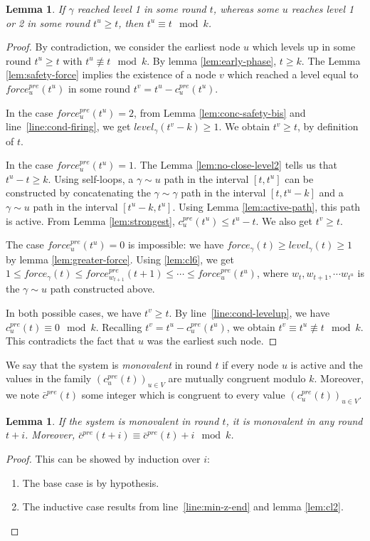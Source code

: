 \documentclass[11pt,letterpaper]{article}
\newtheorem{lem}[thm]{Lemma}
\newcommand{\cent}{\gamma}
\begin{document}
\begin{lem} \label{lem:later-level1}
	If $\cent$ reached level 1 in some round $t$, whereas some $u$ reaches level 1 or 2 in some round $t^u \geq t$, then $t^u \equiv t \mod k$. 
\end{lem}
\begin{proof}
	By contradiction, we consider the earliest node $u$ which levels up in some round $t^u \geq t$ with $t^u \not\equiv t \mod k$.
	By lemma \ref{lem:early-phase}, $t \geq k$.
	The Lemma \ref{lem:safety-force} implies the existence of a node $v$ which reached a level equal to $force_u^{pre}(t^u)$ in some round $t^v = t^u-c_u^{pre}(t^u)$. 

	In the case $force_u^{pre}(t^u) = 2$, from Lemma \ref{lem:conc-safety-bis} and line~\ref{line:cond-firing}, we get $level_\cent(t^v-k) \geq 1$. We obtain $t^v \geq t$, by definition of $t$.

	In the case $force_u^{pre}(t^u) = 1$.
	The Lemma \ref{lem:no-close-level2} tells us that $t^u-t \geq k$.
	Using self-loops, a $\cent \sim u$ path in the interval $[t,t^u]$ can be constructed by concatenating the $\cent \sim \cent$ path in the interval $[t,t^u-k]$
	and a $\cent \sim u$ path in the interval $[t^u-k,t^u]$.
	Using Lemma \ref{lem:active-path}, this path is active.
	From Lemma \ref{lem:strongest}, $c_u^{pre}(t^u) \leq t^u-t$.
	We also get $t^v \geq t$.

	The case $force_u^{pre}(t^u) = 0$ is impossible: we have $force_\cent(t) \geq level_\cent(t) \geq 1$ by lemma \ref{lem:greater-force}.
	Using \ref{lem:cl6}, we get $1 \leq force_\cent(t) \leq force_{w_{t+1}}^{pre}(t+1) \leq \cdots \leq force_u^{pre}(t^u)$,
	where $w_t, w_{t+1}, \cdots w_{t^u}$ is the $\cent \sim u$ path constructed above.

	In both possible cases, we have $t^v \geq t$.
	By line~\ref{line:cond-levelup}, we have $c_u^{pre}(t) \equiv 0 \mod k$.
	Recalling $t^v = t^u-c_u^{pre}(t^u)$, we obtain $t^v \equiv t^u \not\equiv t \mod k$.
	This contradicts the fact that $u$ was the earliest such node.
\end{proof}

We say that the system is \textit{monovalent} in round $t$ if every node $u$ is active and the values in the family $(c_u^{pre}(t))_{u \in V}$ are mutually congruent modulo $k$.
Moreover, we note $\bar c^{pre}(t)$ some integer which is congruent to every value $(c_u^{pre}(t))_{u \in V}$.

\begin{lem} \label{lem:monovalent}
	If the system is monovalent in round $t$, it is monovalent in any round $t+i$.
	Moreover, $\bar c^{pre}(t+i) \equiv \bar c^{pre}(t)+i \mod k$.
\end{lem}
\begin{proof}
	This can be showed by induction over $i$:
	\begin{enumerate}
		\item The base case is by hypothesis.
		\item The inductive case results from line~\ref{line:min-z-end} and lemma \ref{lem:cl2}.
	\end{enumerate}
\end{proof}
\end{document}
